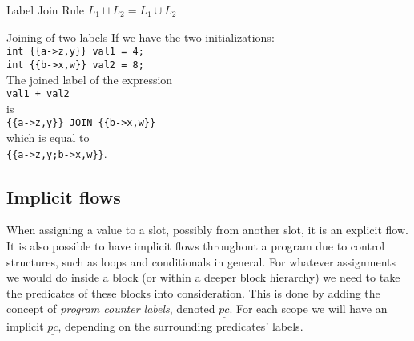 \begin{definition}{Label Join Rule}
  $L_1 \sqcup L_2 = L_1 \cup L_2$
\end{definition}

\begin{example}{Joining of two labels}
  If we have the two initializations:\\
  \texttt{int \{\{a->z,y\}\} val1 = 4;}\\
  \texttt{int \{\{b->x,w\}\} val2 = 8;}\\[1em]
  The joined label of the expression\\
   \texttt{val1 + val2}\\
   is\\
   \texttt{\{\{a->z,y\}\} JOIN \{\{b->x,w\}\}}\\
   which is equal to\\
   \texttt{\{\{a->z,y;b->x,w\}\}}.
\end{example}

\subsection{Implicit flows}
\newcommand{\dlmpc}{$\underline{pc}$}
When assigning a value to a slot, possibly from another slot, it is an explicit flow.
It is also possible to have implicit flows throughout a program due to control structures, such as loops and conditionals in general.
For whatever assignments we would do inside a block (or within a deeper block hierarchy) we need to take the predicates of these blocks into consideration.
This is done by adding the concept of \emph{program counter labels}, denoted \dlmpc.
For each scope we will have an implicit \dlmpc, depending on the surrounding predicates' labels.
